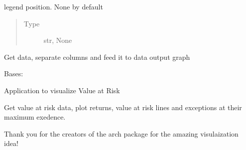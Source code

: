 \documentclass[letterpaper,10pt,english]{sphinxmanual}
\begin{document}
\begin{fulllineitems}

\begin{fulllineitems}
\label{\detokenize{dalio.application:dalio.application.graphers.PandasXYGrapher._legend}}
legend position. None by default
\begin{quote}\begin{description}
\item[{Type}] \leavevmode
str, None

\end{description}\end{quote}

\end{fulllineitems}


\begin{fulllineitems}
\label{\detokenize{dalio.application:dalio.application.graphers.PandasXYGrapher.run}}
Get data, separate columns and feed it to data output graph

\end{fulllineitems}


\end{fulllineitems}


\begin{fulllineitems}
\label{\detokenize{dalio.application:dalio.application.graphers.VaRGrapher}}
Bases: {\hyperref[\detokenize{dalio.application:dalio.application.graphers.Grapher}]{}}

Application to visualize Value at Risk

\begin{fulllineitems}
\label{\detokenize{dalio.application:dalio.application.graphers.VaRGrapher.run}}
Get value at risk data, plot returns, value at risk lines and
exceptions at their maximum exedence.

Thank you for the creators of the arch package for the amazing
visulaization idea!

\end{fulllineitems}


\end{fulllineitems}
\end{document}
